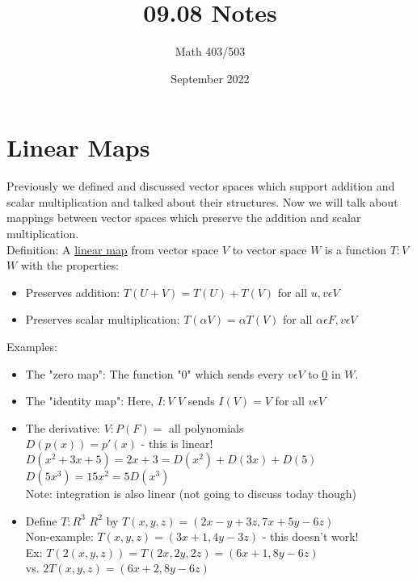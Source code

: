 \documentclass{article}
\title{09.08 Notes}
\author{Math 403/503 }
\date{September 2022}
\begin{document}
\maketitle

\section{Linear Maps}

Previously we defined and discussed vector spaces which support addition and scalar multiplication and talked about their structures. Now we will talk about mappings between vector spaces which preserve the addition and scalar multiplication. \\ 

Definition: A \underline{linear map} from vector space $V$ to vector space $W$ is a function $T: V$ \textrightarrow $W$ with the properties: \begin{itemize} 
\item Preserves addition: $T(U+V) = T(U) + T(V)$ for all $u, v \epsilon V$
\item Preserves scalar multiplication: $T(\alpha V) = \alpha T(V)$ for all $\alpha \epsilon F, v \epsilon V$

\end{itemize}

Examples: \begin{itemize} 
\item The "zero map": The function "0" which sends every $v \epsilon V$ to \underline{0} in $W$. 
\item The "identity map": Here, $I:V$ \textrightarrow $V$ sends $I(V) = V$ for all $v \epsilon V$
\item The derivative: $V: P(F) =$ all polynomials \\
$D(p(x)) = p'(x)$ - this is linear! \\
$D(x^{2} + 3x + 5) = 2x+3 = D(x^{2}) + D(3x) + D(5)$\\
$D(5x^{3}) = 15x^{2} = 5D(x^3)$\\
Note: integration is also linear (not going to discuss today though)
\item Define $T: R^3$ \textrightarrow $R^2$ by $T(x, y, z) = (2x - y + 3z, 7x + 5y -6z)$ \\
Non-example: $T(x, y, z) = (3x+1, 4y - 3z)$ - this doesn't work! \\
Ex: $T(2(x, y, z)) = T(2x, 2y, 2z) = (6x + 1, 8y - 6z)$\\
vs. $2T(x, y, z) = (6x + 2, 8y - 6z)$

\end{itemize}
\end{document}
